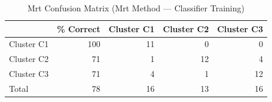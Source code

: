 \begin{table}[htbp]
  \centering
  \caption{Mrt Confusion Matrix (Mrt Method — Classifier Training)}
  \label{tab:MRT_Method_classifier_training_tables_mrt_confusion_matrix}
  \begin{tabular}{lrrrr}
    \toprule
     & \% Correct & Cluster C1 & Cluster C2 & Cluster C3 \\
    \midrule
    Cluster C1 & 100 & 11 & 0 & 0 \\
    Cluster C2 & 71 & 1 & 12 & 4 \\
    Cluster C3 & 71 & 4 & 1 & 12 \\
    Total & 78 & 16 & 13 & 16 \\
    \bottomrule
  \end{tabular}
\end{table}

